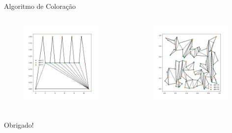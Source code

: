 \documentclass[aspectratio=169,usenames,dvipsnames]{beamer}
\begin{document}
\begin{frame}{Algoritmo de Coloração}
    \begin{columns}
      \begin{center}
        \begin{figure}
        \includegraphics[width=0.95\textwidth]{figures/corn_example_coloring.png}
        \end{figure}
      \end{center}
    \begin{center}
      \begin{figure}
        \includegraphics[width=0.95\textwidth]{figures/caxeiro_color.png}
      \end{figure}
    \end{center}
  \end{columns}
\end{frame}

\begin{frame}
  \frametitle{}
  \begin{center}
    \Huge{Obrigado!}
  \end{center}
\end{frame}
\end{document}

